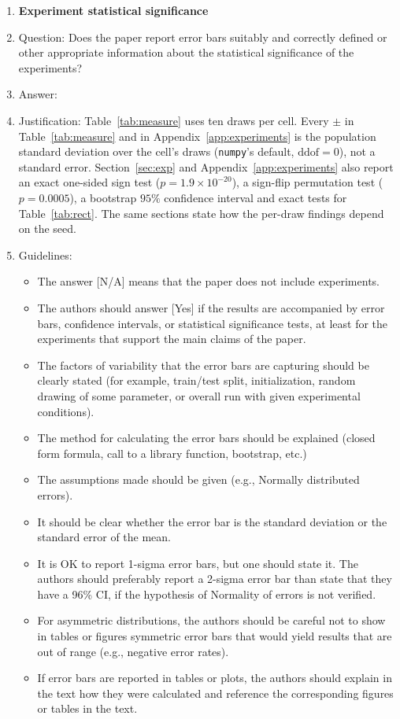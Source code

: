 \begin{enumerate}
\item {\bf Experiment statistical significance}
    \item[] Question: Does the paper report error bars suitably and correctly defined or other appropriate information about the statistical significance of the experiments?
    \item[] Answer: \answerYes{}
    \item[] Justification: Table~\ref{tab:measure} uses ten draws per cell. Every $\pm$ in Table~\ref{tab:measure} and in Appendix~\ref{app:experiments} is the population standard deviation over the cell's draws (\texttt{numpy}'s default, $\mathrm{ddof}=0$), not a standard error. Section~\ref{sec:exp} and Appendix~\ref{app:experiments} also report an exact one-sided sign test ($p = 1.9\times10^{-20}$), a sign-flip permutation test ($p = 0.0005$), a bootstrap $95\%$ confidence interval and exact tests for Table~\ref{tab:rect}. The same sections state how the per-draw findings depend on the seed.
    \item[] Guidelines:
    \begin{itemize}
        \item The answer [N/A] means that the paper does not include experiments.
        \item The authors should answer [Yes] if the results are accompanied by error bars, confidence intervals, or statistical significance tests, at least for the experiments that support the main claims of the paper.
        \item The factors of variability that the error bars are capturing should be clearly stated (for example, train/test split, initialization, random drawing of some parameter, or overall run with given experimental conditions).
        \item The method for calculating the error bars should be explained (closed form formula, call to a library function, bootstrap, etc.)
        \item The assumptions made should be given (e.g., Normally distributed errors).
        \item It should be clear whether the error bar is the standard deviation or the standard error of the mean.
        \item It is OK to report 1-sigma error bars, but one should state it. The authors should preferably report a 2-sigma error bar than state that they have a 96\% CI, if the hypothesis of Normality of errors is not verified.
        \item For asymmetric distributions, the authors should be careful not to show in tables or figures symmetric error bars that would yield results that are out of range (e.g., negative error rates).
        \item If error bars are reported in tables or plots, the authors should explain in the text how they were calculated and reference the corresponding figures or tables in the text.
    \end{itemize}


\end{enumerate}
